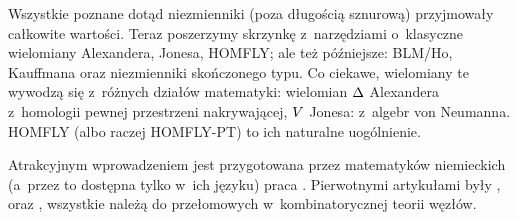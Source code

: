 
Wszystkie poznane dotąd niezmienniki (poza długością sznurową) przyjmowały całkowite wartości.
Teraz poszerzymy skrzynkę z~narzędziami o~klasyczne wielomiany Alexandera, Jonesa, HOMFLY; ale też późniejsze: BLM/Ho, Kauffmana oraz niezmienniki skończonego typu.
Co ciekawe, wielomiany te wywodzą się z~różnych działów matematyki: wielomian $\Delta$ Alexandera z~homologii pewnej przestrzeni nakrywającej, $V$ Jonesa: z~algebr von Neumanna.
HOMFLY (albo raczej HOMFLY-PT) to ich naturalne uogólnienie.

Atrakcyjnym wprowadzeniem jest przygotowana przez matematyków niemieckich (a~przez to dostępna tylko w~ich języku) praca \cite{gellert09}.
Pierwotnymi artykułami były \cite{alexander28}, \cite{jones85} oraz \cite{homfly85}, wszystkie należą do przełomowych w~kombinatorycznej teorii węzłów.

